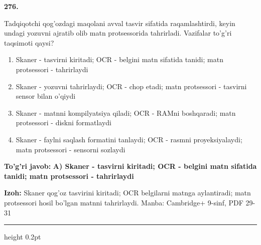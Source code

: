 \documentclass[10pt,a4paper]{article}
\begin{document}
{\bfseries\sffamily\color{ink} 276.}
\par
Tadqiqotchi qog'ozdagi maqolani avval tasvir sifatida raqamlashtirdi, keyin undagi yozuvni ajratib olib matn protsessorida tahrirladi. Vazifalar to'g'ri taqsimoti qaysi?
\begin{enumerate}[label=\Alph*),leftmargin=9mm]
\item Skaner - tasvirni kiritadi; OCR - belgini matn sifatida tanidi; matn protsessori - tahrirlaydi
\item Skaner - yozuvni tahrirlaydi; OCR - chop etadi; matn protsessori - tasvirni sensor bilan o'qiydi
\item Skaner - matnni kompilyatsiya qiladi; OCR - RAMni boshqaradi; matn protsessori - diskni formatlaydi
\item Skaner - faylni saqlash formatini tanlaydi; OCR - rasmni proyeksiyalaydi; matn protsessori - sensorni sozlaydi
\end{enumerate}
\begin{tcolorbox}[enhanced,breakable,colback=teal!4,colframe=teal!60!black,boxrule=0.45pt,arc=1.2mm,left=2.7mm,right=2.7mm,top=1.8mm,bottom=1.8mm,before skip=2mm,after skip=2mm]
{\bfseries\sffamily\color{teal}To'g'ri javob:} \textbf{A) Skaner - tasvirni kiritadi; OCR - belgini matn sifatida tanidi; matn protsessori - tahrirlaydi}
\par\smallskip
{\bfseries Izoh:} Skaner qog'oz tasvirini kiritadi; OCR belgilarni matnga aylantiradi; matn protsessori hosil bo'lgan matnni tahrirlaydi. Manba: Cambridge+ 9-sinf, PDF 29-31
\end{tcolorbox}
\vspace{2mm}\hrule height 0.2pt\vspace{3mm}
\end{document}
